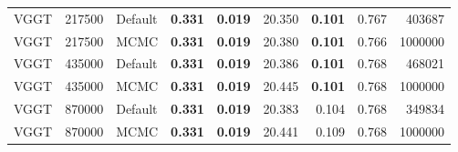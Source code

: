 \begin{table}[H]
\begin{tabular}{lrlrrrrrr}
VGGT & 217500 & Default & \textbf{0.331} & \textbf{0.019} & 20.350 & \textbf{0.101} & 0.767 & 403687 \\
VGGT & 217500 & MCMC & \textbf{0.331} & \textbf{0.019} & 20.380 & \textbf{0.101} & 0.766 & 1000000 \\
VGGT & 435000 & Default & \textbf{0.331} & \textbf{0.019} & 20.386 & \textbf{0.101} & 0.768 & 468021 \\
VGGT & 435000 & MCMC & \textbf{0.331} & \textbf{0.019} & 20.445 & \textbf{0.101} & 0.768 & 1000000 \\
VGGT & 870000 & Default & \textbf{0.331} & \textbf{0.019} & 20.383 & 0.104 & 0.768 & 349834 \\
VGGT & 870000 & MCMC & \textbf{0.331} & \textbf{0.019} & 20.441 & 0.109 & 0.768 & 1000000 \\
\bottomrule
\end{tabular}
\end{table}
